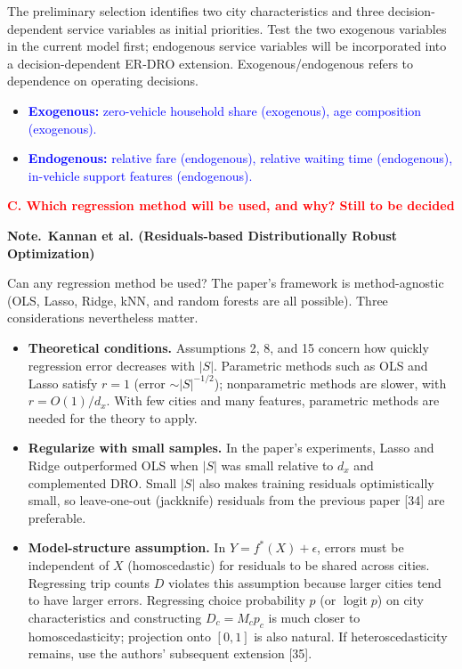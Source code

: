 \documentclass[10pt,a4paper]{article}
\newcommand{\note}{\textbf{Note.}\ }
\begin{document}
The preliminary selection identifies two city characteristics and three decision-dependent service variables as initial priorities. Test the two exogenous variables in the current model first; endogenous service variables will be incorporated into a decision-dependent ER-DRO extension. Exogenous/endogenous refers to dependence on operating decisions.
\begin{itemize}
\item \textcolor{blue}{\textbf{Exogenous:} zero-vehicle household share (exogenous), age composition (exogenous).}
\item \textcolor{blue}{\textbf{Endogenous:} relative fare (endogenous), relative waiting time (endogenous), in-vehicle support features (endogenous).}
\end{itemize}
\textcolor{red}{\textbf{C. Which regression method will be used, and why? Still to be decided}}
\begin{mdframed}[linewidth=0.6pt]
\footnotesize
\note \textbf{Kannan et al. (Residuals-based Distributionally Robust Optimization)}

Can any regression method be used? The paper's framework is method-agnostic (OLS, Lasso, Ridge, kNN, and random forests are all possible). Three considerations nevertheless matter.
\begin{itemize}
\item \textbf{Theoretical conditions.} Assumptions 2, 8, and 15 concern how quickly regression error decreases with $|S|$. Parametric methods such as OLS and Lasso satisfy $r=1$ (error $\sim|S|^{-1/2}$); nonparametric methods are slower, with $r=O(1)/d_x$. With few cities and many features, parametric methods are needed for the theory to apply.
\item \textbf{Regularize with small samples.} In the paper's experiments, Lasso and Ridge outperformed OLS when $|S|$ was small relative to $d_x$ and complemented DRO. Small $|S|$ also makes training residuals optimistically small, so leave-one-out (jackknife) residuals from the previous paper [34] are preferable.
\item \textbf{Model-structure assumption.} In $Y=f^*(X)+\epsilon$, errors must be independent of $X$ (homoscedastic) for residuals to be shared across cities. Regressing trip counts $D$ violates this assumption because larger cities tend to have larger errors. Regressing choice probability $p$ (or $\operatorname{logit}p$) on city characteristics and constructing $D_c=M_cp_c$ is much closer to homoscedasticity; projection onto $[0,1]$ is also natural. If heteroscedasticity remains, use the authors' subsequent extension [35].
\end{itemize}
\end{mdframed}
\end{document}
